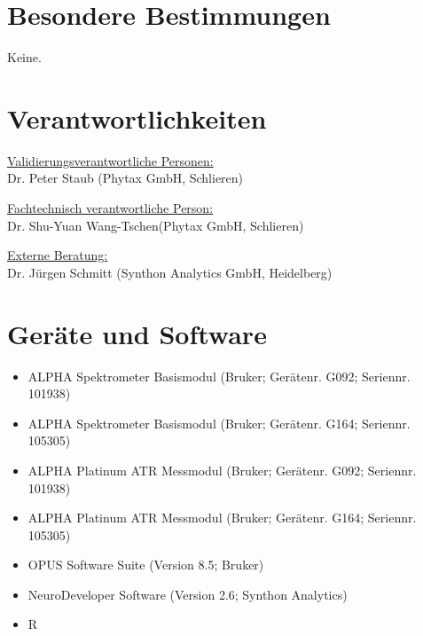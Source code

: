 \documentclass[11pt, a4paper]{article}
\begin{document}
\section{Besondere Bestimmungen}
Keine.

\section{Verantwortlichkeiten}
\uline{Validierungsverantwortliche Personen:}\\
Dr. Peter Staub (Phytax GmbH, Schlieren)

\uline{Fachtechnisch verantwortliche Person:}\\
Dr. Shu-Yuan Wang-Tschen(Phytax GmbH, Schlieren)

\uline{Externe Beratung:}\\
Dr. Jürgen Schmitt (Synthon Analytics GmbH, Heidelberg)


\section{Geräte und Software}
\begin{itemize}
\item ALPHA Spektrometer Basismodul (Bruker; Gerätenr. G092; Seriennr. 101938)
\item ALPHA Spektrometer Basismodul (Bruker; Gerätenr. G164; Seriennr. 105305)
\item ALPHA Platinum ATR Messmodul (Bruker; Gerätenr. G092; Seriennr. 101938)
\item ALPHA Platinum ATR Messmodul (Bruker; Gerätenr. G164; Seriennr. 105305)
\item OPUS Software Suite (Version 8.5; Bruker)
\item NeuroDeveloper Software (Version 2.6; Synthon Analytics)
\item R
\end{itemize}
\end{document}
